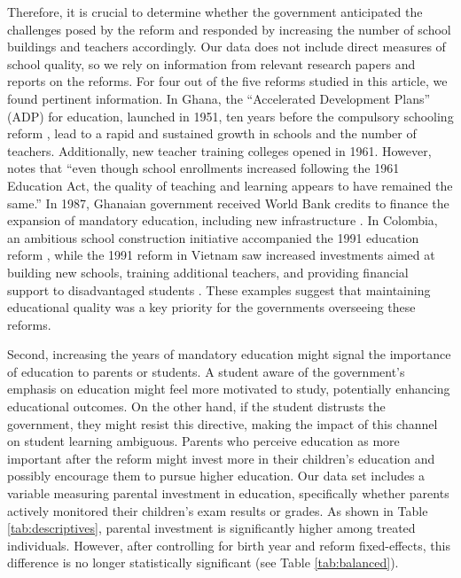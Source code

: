 Therefore, it is crucial to determine whether the government anticipated the challenges posed by the reform and responded by increasing the number of school buildings and teachers accordingly. Our data does not include direct measures of school quality, so we rely on information from relevant research papers and reports on the reforms. For four out of the five reforms studied in this article, we found pertinent information. In Ghana, the ``Accelerated Development Plans'' (ADP) for education, launched in 1951, ten years before the compulsory schooling reform \parencite{kadingdi_policy_2006}, lead to a rapid and sustained growth in schools and the number of teachers. Additionally, new teacher training colleges opened in 1961. However, \citet{kadingdi_policy_2006} notes that ``even though school enrollments increased following the 1961 Education Act, the quality of teaching and learning appears to have remained the same.'' In 1987, Ghanaian government received World Bank credits to finance the expansion of mandatory education, including new infrastructure \parencite{kadingdi_policy_2006}. In Colombia, an ambitious school construction initiative accompanied the 1991 education reform \parencite{urbina_mass_2022}, while the 1991 reform in Vietnam saw increased investments aimed at building new schools, training additional teachers, and providing financial support to disadvantaged students \parencite{cornelissen_multigenerational_2022, nguyen_trends_2004}. These examples suggest that maintaining educational quality was a key priority for the governments overseeing these reforms.


Second, increasing the years of mandatory education might signal the importance of education to parents or students. A student aware of the government's emphasis on education might feel more motivated to study, potentially enhancing educational outcomes. On the other hand, if the student distrusts the government, they might resist this directive, making the impact of this channel on student learning ambiguous. Parents who perceive education as more important after the reform might invest more in their children's education and possibly encourage them to pursue higher education. Our data set includes a variable measuring parental investment in education, specifically whether parents actively monitored their children's exam results or grades. As shown in Table \ref{tab:descriptives}, parental investment is significantly higher among treated individuals. However, after controlling for birth year and reform fixed-effects, this difference is no longer statistically significant (see Table \ref{tab:balanced}).

